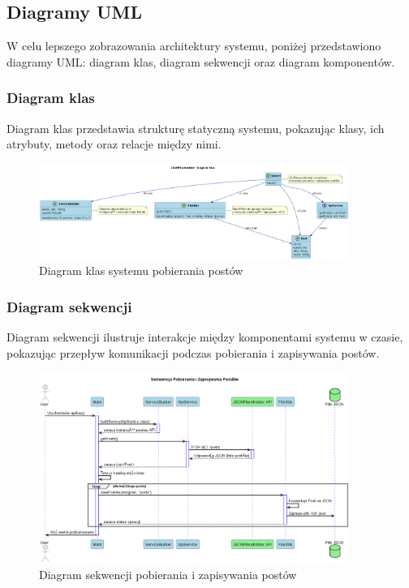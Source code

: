 \documentclass[12pt,a4paper]{article}
\begin{document}
\subsection{Diagramy UML}

W celu lepszego zobrazowania architektury systemu, poniżej przedstawiono diagramy UML: diagram klas, diagram sekwencji oraz diagram komponentów.

\subsubsection{Diagram klas}

Diagram klas przedstawia strukturę statyczną systemu, pokazując klasy, ich atrybuty, metody oraz relacje między nimi.

\begin{figure}[h]
\centering
\includegraphics[width=0.9\textwidth]{plantuml/class_diagram.png}
\caption{Diagram klas systemu pobierania postów}
\label{fig:class-diagram}
\end{figure}

\subsubsection{Diagram sekwencji}

Diagram sekwencji ilustruje interakcje między komponentami systemu w czasie, pokazując przepływ komunikacji podczas pobierania i zapisywania postów.

\begin{figure}[h]
\centering
\includegraphics[width=0.9\textwidth]{plantuml/sequence_diagram.png}
\caption{Diagram sekwencji pobierania i zapisywania postów}
\label{fig:sequence-diagram}
\end{figure}
\end{document}
